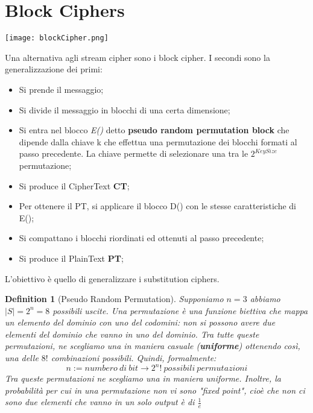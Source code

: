 \documentclass{article}
\newtheorem{definition}{Definition}[section]
\theoremstyle{remark}
\begin{document}
\section{Block Ciphers}
\begin{center}
    \texttt{[image: blockCipher.png]}
\end{center}
Una alternativa agli stream cipher sono i block cipher. I secondi sono la generalizzazione dei primi: 
\begin{itemize}
    \item Si prende il messaggio;
    \item Si divide il messaggio in blocchi di una certa dimensione;
    \item Si entra nel blocco \emph{E()} detto \textbf{pseudo random permutation block} che dipende dalla chiave k che effettua una permutazione dei blocchi formati al passo precedente. La chiave permette di selezionare una tra le $2^{KeySize}$ permutazione;
    \item Si produce il CipherText \textbf{CT};
    \item Per ottenere il PT, si applicare il blocco D() con le stesse caratteristiche di E();
    \item Si compattano i blocchi riordinati ed ottenuti al passo precedente;
    \item Si produce il PlainText \textbf{PT};
\end{itemize}
L'obiettivo è quello di generalizzare i substitution ciphers.
\begin{definition}[Pseudo Random Permutation]
Supponiamo $n=3$ abbiamo $|S|=2^n=8$ possibili uscite. Una permutazione è una funzione biettiva che mappa un elemento del dominio con uno del codomini: non si possono avere due elementi del dominio che vanno in uno del dominio.\newline
Tra tutte queste permutazioni, ne scegliamo una in maniera casuale (\textbf{uniforme}) ottenendo così, una delle $8!$ combinazioni possibili.
Quindi, formalmente:
\begin{equation}
    n:= numbero\ di\ bit \rightarrow 2^{n}!\ possibili\ permutazioni
\end{equation}
Tra queste permutazioni ne scegliamo una in maniera uniforme. Inoltre, la probabilità per cui in una permutazione non vi sono "fixed point", cioè che non ci sono due elementi che vanno in un solo output è di $\frac{1}{e}$
\end{definition}
\end{document}
